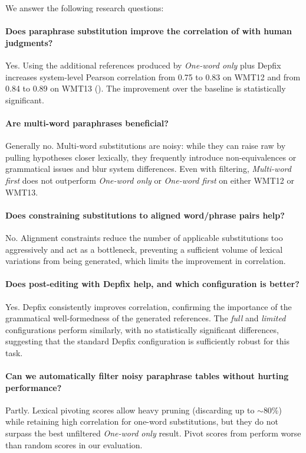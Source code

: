 \begin{mdframed}[
    linecolor=gray,
    linewidth=2pt,
    roundcorner=5,
    backgroundcolor=gray!5
]
\noindent
We answer the following research questions:

\paragraph{Does paraphrase substitution improve the correlation of \bleu with human judgments?}
Yes. Using the additional references produced by \emph{One-word only} plus Depfix increases system-level Pearson correlation from 0.75 to 0.83 on WMT12 and from 0.84 to 0.89 on WMT13 (). The improvement over the baseline is statistically significant.

\paragraph{Are multi-word paraphrases beneficial?}
Generally no. Multi-word substitutions are noisy: while they can raise raw \bleu by pulling hypotheses closer lexically, they frequently introduce non-equivalences or grammatical issues and blur system differences. Even with filtering, \emph{Multi-word first} does not outperform \emph{One-word only} or \emph{One-word first} on either WMT12 or WMT13.

\paragraph{Does constraining substitutions to aligned word/phrase pairs help?}
No. Alignment constraints reduce the number of applicable substitutions too aggressively and act as a bottleneck, preventing a sufficient volume of lexical variations from being generated, which limits the improvement in \bleu correlation.

\paragraph{Does post-editing with Depfix help, and which configuration is better?}
Yes. Depfix consistently improves correlation, confirming the importance of the grammatical well-formedness of the generated references. The \emph{full} and \emph{limited} configurations perform similarly, with no statistically significant differences, suggesting that the standard Depfix configuration is sufficiently robust for this task.

\paragraph{Can we automatically filter noisy paraphrase tables without hurting performance?}
Partly. Lexical pivoting scores allow heavy pruning (discarding up to $\sim$80\%) while retaining high correlation for one-word substitutions, but they do not surpass the best unfiltered \emph{One-word only} result. Pivot scores from \mpt perform worse than random scores in our evaluation. 


\end{mdframed}